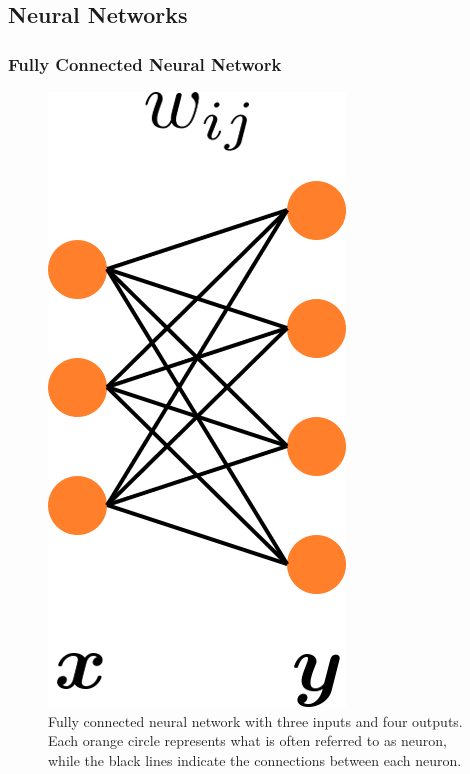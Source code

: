 \subsection{Neural Networks}
\label{sec::321_nn}
\cite{weng1992cresceptron} %
\cite{krizhevsky2012imagenet} %
\subsubsection{Fully Connected Neural Network}
%
\begin{figure}[h]
	\centering
	\includegraphics[scale=.28]{chapters/03_background/img/fully_connected.png}
	\caption{Fully connected neural network with three inputs and four outputs. Each orange circle represents what is often referred to as neuron, while the black lines indicate the connections between each neuron.}
	\label{fig::321_fully_connected}
\end{figure}

